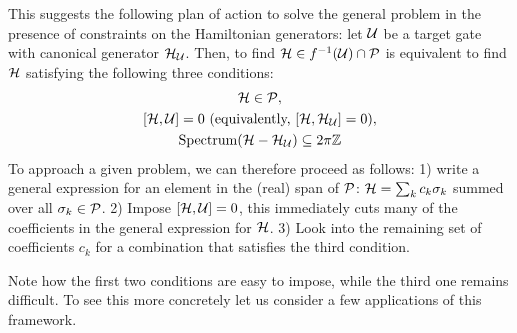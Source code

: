 This suggests the following plan of action to solve the general problem in the presence of constraints on the Hamiltonian generators: let ${\mathcal{U}}$ be a target gate with canonical generator ${\mathcal{H}}_{{\mathcal{U}}}$. Then, to find ${\mathcal{H}}\in f^{-1}({\mathcal{U}})\cap{\mathcal{P}}$ is equivalent to find ${\mathcal{H}}$ satisfying the following three conditions:
\begin{subequations}
\begin{gather}
    \calH\in\calP, \label{eq:GL:3conditions_1st}\\
    [\calH,\calU]=0 \text{ (equivalently, $[\calH,\calH_{\calU}]=0$)}, \label{eq:GL:3conditions_2nd}\\
    \on{Spectrum}(\calH-\calH_{\calU})\subseteq2\pi\ZZ \label{eq:GL:3conditions_3rd}
\end{gather}
\label{eq:GL:3conditions}
\end{subequations}
To approach a given problem, we can therefore proceed as follows:
1) write a general expression for an element in the (real) span of ${\mathcal{P}}$: ${\mathcal{H}}=\sum_k c_k \sigma_k$ summed over all $\sigma_k\in{\mathcal{P}}$.
2) Impose $[{\mathcal{H}},{\mathcal{U}}]=0$, this immediately cuts many of the coefficients in the general expression for ${\mathcal{H}}$.
3) Look into the remaining set of coefficients $c_k$ for a combination that satisfies the third condition.

Note how the first two conditions are easy to impose, while the third one remains difficult. To see this more concretely let us consider a few applications of this framework.

